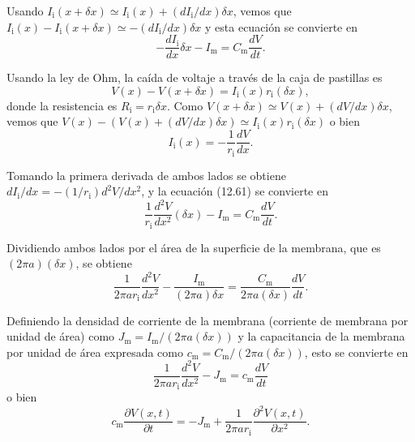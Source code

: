 \documentclass[12pt]{book}
\begin{document}
Usando $I_{\text{i}}(x + \delta x) \simeq I_{\text{i}}(x) + (dI_{\text{i}}/dx)\delta x$, vemos que $I_{\text{i}}(x) - I_{\text{i}}(x + \delta x) \simeq -(dI_{\text{i}}/dx)\delta x$ y esta ecuación se convierte en
\begin{equation}
-\frac{dI_{\text{i}}}{dx} \delta x - I_{\text{m}} = C_{\text{m}} \frac{dV}{dt}.
\label{eq:12.61}
\end{equation}

Usando la ley de Ohm, la caída de voltaje a través de la caja de pastillas es
\begin{equation}
V(x) - V(x + \delta x) = I_{\text{i}}(x) r_{\text{i}}(\delta x),
\label{eq:12.62}
\end{equation}
donde la resistencia es $R_{\text{i}} = r_{\text{i}}\delta x$. Como $V(x + \delta x) \simeq V(x) + (dV/dx)\delta x$, vemos que $V(x) - (V(x) + (dV/dx)\delta x) \simeq I_{\text{i}}(x) r_{\text{i}}(\delta x)$ o bien
\begin{equation}
I_{\text{i}}(x) = -\frac{1}{r_{\text{i}}} \frac{dV}{dx}.
\label{eq:12.63}
\end{equation}

Tomando la primera derivada de ambos lados se obtiene $dI_{\text{i}}/dx = -(1/r_{\text{i}})d^2V/dx^2$, y la ecuación (12.61) se convierte en
\begin{equation}
\frac{1}{r_{\text{i}}} \frac{d^2V}{dx^2} (\delta x) - I_{\text{m}} = C_{\text{m}} \frac{dV}{dt}.
\label{eq:12.64}
\end{equation}

Dividiendo ambos lados por el área de la superficie de la membrana, que es $(2\pi a)(\delta x)$, se obtiene
\begin{equation}
\frac{1}{2\pi a r_{\text{i}}} \frac{d^2V}{dx^2} - \frac{I_{\text{m}}}{(2\pi a)\delta x} = \frac{C_{\text{m}}}{2\pi a(\delta x)} \frac{dV}{dt}.
\label{eq:12.65}
\end{equation}

Definiendo la densidad de corriente de la membrana (corriente de membrana por unidad de área) como $J_{\text{m}} = I_{\text{m}}/(2\pi a(\delta x))$ y la capacitancia de la membrana por unidad de área expresada como $c_{\text{m}} = C_{\text{m}}/(2\pi a(\delta x))$, esto se convierte en
\begin{equation}
\frac{1}{2\pi a r_{\text{i}}} \frac{d^2V}{dx^2} - J_{\text{m}} = c_{\text{m}} \frac{dV}{dt}
\label{eq:12.66}
\end{equation}
o bien
\begin{equation}
c_{\text{m}} \frac{\partial V(x, t)}{\partial t} = -J_{\text{m}} + \frac{1}{2\pi a r_{\text{i}}} \frac{\partial^2 V(x, t)}{\partial x^2}.
\label{eq:12.67}
\end{equation}
\end{document}
